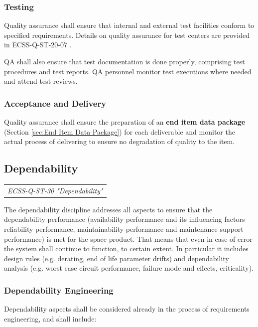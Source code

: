 \subsubsection{Testing}

Quality assurance shall ensure that internal and external test facilities conform to specified requirements. Details on quality assurance for test centers are provided in ECSS-Q-ST-20-07 \cite{ECSS-Q-ST-20-07}.

QA shall also ensure that test documentation is done properly, comprising test procedures and test reports. QA personnel monitor test executions where needed and attend test reviews.

\subsubsection{Acceptance and Delivery}

Quality assurance shall ensure the preparation of an \textbf{end item data package} (Section \ref{sec:End Item Data Package}) for each deliverable and monitor the actual process of delivering to ensure no degradation of quality to the item.

\subsection{Dependability}

\begin{tabular}{l}
\textit{ECSS-Q-ST-30 "Dependability" \cite{ECSS-Q-ST-30}}
\end{tabular}

The dependability discipline addresses all aspects to ensure that the dependability performance (availability performance and its influencing factors reliability performance, maintainability performance and maintenance support performance) is met for the space product. That means that even in case of error the system shall continue to function, to certain extent. In particular it includes design rules (e.g. derating, end of life parameter drifts) and dependability analysis (e.g. worst case circuit performance, failure mode and effects, criticality).

\subsubsection{Dependability Engineering}

Dependability aspects shall be considered already in the process of requirements engineering, and shall include:

